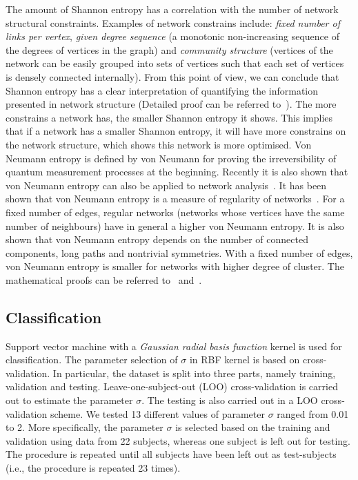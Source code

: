 The amount of Shannon entropy has a correlation with the number of network structural constraints. Examples of network constrains include: \emph{fixed number of links per vertex}, \emph{given degree sequence} (a monotonic non-increasing sequence of the degrees of vertices in the graph) and \emph{community structure} (vertices of the network can be easily grouped into sets of vertices such that each set of vertices is densely connected internally). From this point of view, we can conclude that Shannon entropy has a clear interpretation of quantifying the information presented in network structure (Detailed proof can be referred to~\cite{anand2009entropy}). The more constrains a network has, the smaller Shannon entropy it shows. This implies that if a network has a smaller Shannon entropy, it will have more constrains on the network structure, which shows this network is more optimised. Von Neumann entropy is defined by von Neumann for proving the irreversibility of quantum measurement processes at the beginning. Recently it is also shown that von Neumann entropy can also be applied to network analysis~\cite{passerini2008neumann}. It has been shown that von Neumann entropy is a measure of regularity of networks~\cite{passerini2008neumann}. For a fixed number of edges, regular networks (networks whose vertices have the same number of neighbours) have in general a higher von Neumann entropy. It is also shown that von Neumann entropy depends on the number of connected components, long paths and nontrivial symmetries. With a fixed number of edges, von Neumann entropy is smaller for networks with higher degree of cluster. The mathematical proofs can be referred to~\cite{passerini2008neumann} and~\cite{anand2009entropy}.

\subsection{Classification}

Support vector machine with a \emph{Gaussian radial basis function} kernel is used for classification. The parameter selection of $\sigma$ in RBF kernel is based on cross-validation. In particular, the dataset is split into three parts, namely training, validation and testing. Leave-one-subject-out (LOO) cross-validation is carried out to estimate the parameter $\sigma$. The testing is also carried out in a LOO cross-validation scheme. We tested 13 different values of parameter $\sigma$ ranged from 0.01 to 2. More specifically, the parameter $\sigma$ is selected based on the training and validation using data from 22 subjects, whereas one subject is left out for testing. The procedure is repeated until all subjects have been left out as test-subjects (i.e., the procedure is repeated 23 times). 

